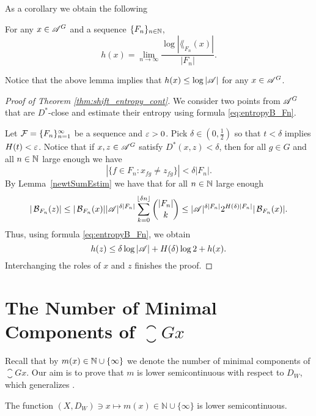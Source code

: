 \noindent
As a corollary we obtain the following
\begin{lem}\label{entropyAdoG}
For any $x\in\mathscr{A}^G$ and a \Folner sequence $\{F_n\}_{n\in\mathbb{N}}$, 
\begin{equation}\label{eq:entropyB_Fn}
h(x)=\lim_{n\to\infty}\frac{\log|\lang_{F_n}(x)|}{|F_n|}.
\end{equation}
\end{lem}

\noindent
Notice that the above lemma implies that $h(x)\leq\log|\mathscr{A}|$ for any $x\in\mathscr{A}^G$.



\begin{proof}[Proof of Theorem \ref{thm:shift_entropy_cont}]
We consider two points from $\mathscr{A}^G$ that are $D^*$-close and estimate their entropy using formula \eqref{eq:entropyB_Fn}.

Let $\operatorname{\mathcal{F}}=\{F_n\}_{n=1}^\infty$ be a \Folner sequence and $\varepsilon>0$.
Pick $\delta\in(0,\frac{1}{2})$ so that $t<\delta$ implies $H(t)<\varepsilon$. Notice that if $x,z\in \mathscr{A}^G$ satisfy
$D^*(x,z)<\delta$, then for all $g\in G$ and all $n\in\mathbb{N}$ large enough we have
\[
|\{f\in F_n : x_{fg}\neq z_{fg}\}|<\delta |F_n|.
\] 
By Lemma~\ref{newtSumEstim} we have that for all $n\in\mathbb{N}$ large enough
\begin{equation*}
|\operatorname{\mathcal{B}}_{F_n}(z)|\leq |\operatorname{\mathcal{B}}_{F_n}(x)||\mathscr{A}|^{\delta|F_n|}\sum_{k=0}^{\lfloor \delta n\rfloor}\binom{|F_n|}{k} 
\leq|\mathscr{A}|^{\delta|F_n|} 2^{H(\delta) |F_n|} |\operatorname{\mathcal{B}}_{F_n}(x)|.
\end{equation*}
Thus, using formula \eqref{eq:entropyB_Fn}, we obtain
\[
h(z)\leq \delta\log{|\mathscr{A}|}+H(\delta)\log 2+h(x).
\]
Interchanging the roles of $x$ and $z$ finishes the proof.
\end{proof}




\section{The Number of Minimal Components of ${\closure{Gx}}$}\label{sec:m}

Recall that by $m(x)\in\mathbb{N}\cup\{\infty\}$ we denote the number of minimal components of $\closure{Gx}$. Our aim is to prove that $m$ is lower semicontinuous with respect to $D_W$, which generalizes \cite[Theorem 1]{DI88}.

\begin{thm}\label{thm:mxCont}
The function $(X,D_W)\ni x \mapsto m(x)\in \mathbb N\cup\{\infty\}$ is lower semicontinuous.
\end{thm}

